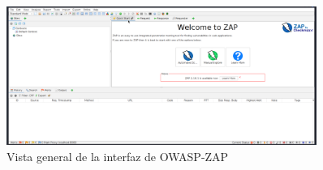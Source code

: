 \documentclass[12pt,a4paper]{article}
\begin{document}
\begin{figure}[H]
\centering
\includegraphics[width=0.9\textwidth]{zap_interfaz.png}
\caption{Vista general de la interfaz de OWASP-ZAP}
\label{fig:zap_interfaz}
\end{figure}
\end{document}
